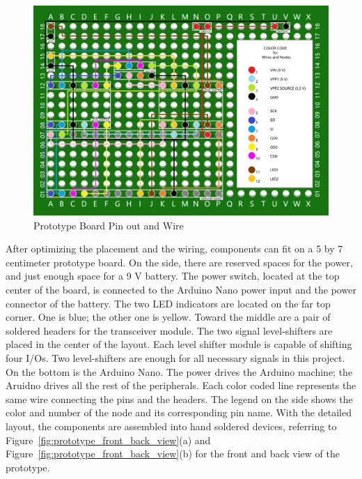 \begin{figure}[ht]
\centering
\includegraphics[width=14cm]{figures/clean_prototype_board.png}
\caption{Prototype Board Pin out and Wire}
\label{fig:prototype_board}
\end{figure}

After optimizing the placement and the wiring, components can fit on a 5 by 7 centimeter prototype board. On the side, there are reserved spaces for the power, and just enough space for a 9 V battery. The power switch, located at the top center of the board, is connected to the Arduino Nano power input and the power connector of the battery. The two LED indicators are located on the far top corner. One is blue; the other one is yellow. Toward the middle are a pair of soldered headers for the transceiver module. The two signal level-shifters are placed in the center of the layout. Each level shifter module is capable of shifting four I/Os. Two level-shifters are enough for all necessary signals in this project. On the bottom is the Arduino Nano. The power drives the Arduino machine; the Aruidno drives all the rest of the peripherals. Each color coded line represents the same wire connecting the pins and the headers. The legend on the side shows the color and number of the node and its corresponding pin name. With the detailed layout, the components are assembled into hand soldered devices, referring to Figure~\ref{fig:prototype_front_back_view}(a) and Figure~\ref{fig:prototype_front_back_view}(b) for the front and back view of the prototype.

